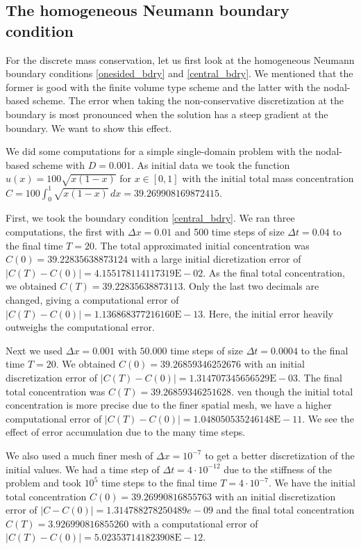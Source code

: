 %
%
\subsection{The homogeneous Neumann boundary condition}
%
%

For the discrete mass conservation, let us first look at the homogeneous Neumann boundary conditions
\eqref{onesided_bdry} and \eqref{central_bdry}. We mentioned that the
former is good with the finite volume type scheme and the latter with the nodal-based scheme. 
The error when taking the non-conservative discretization at
the boundary is most pronounced when the solution has a steep gradient
at the boundary. We want to show this effect.

We did some computations for a simple single-domain problem with the nodal-based scheme with $D=0.001$. 
As initial data we took the function $u(x) = 100\sqrt{x(1-x)}$ for $x\in [0,1]$
with the initial total mass concentration $C=100\int_{0}^{1} \sqrt{x(1-x)}\,dx=39.269908169872415$.

First, we took the boundary condition \eqref{central_bdry}.
We ran three computations, the first with $\Delta x = 0.01$ and 500 time steps
of size $\Delta t = 0.04$ to the final time $T=20$.
The total approximated initial concentration was $C(0)=39.22835638873124$
with a large initial dicretization error of $|C(T)-C(0)|= 4.155178114117319\text{E}-02$. As the final
total concentration, we obtained $C(T) =39.22835638873113$. Only the last two decimals
are changed, giving a computational error of $|C(T)-C(0)|=1.136868377216160\text{E}-13$. Here, the initial error heavily outweighs the computational error.

Next we used $\Delta x = 0.001$ with $50.000$ time steps of size $\Delta t = 0.0004$ to
the final time $T=20$.
We obtained $C(0) = 39.26859346252676$ with an initial discretization error of $|C(T)-C(0)|=1.314707345656529\text{E}-03$. The final total concentration was
$C(T)=39.26859346251628$. 
ven though the initial total concentration is
more precise due to the finer spatial mesh, we have a higher computational error of
$|C(T)-C(0)|=1.048050535246148\text{E}-11$. We see the effect of error accumulation due to the
many time steps. 

We also used a much finer mesh of $\Delta x = 10^{-7}$ to get 
a better discretization of the initial values.
We had a time step of $\Delta t = 4\cdot 10^{-12}$ due to the stiffness of the problem and took $10^5$ time steps to the
final time $T=4\cdot 10^{-7}$. We have the initial total
concentration $C(0)=39.26990816855763$ with an initial discretization error of $|C-C(0)|=1.314788278250489e-09$ and the final
total concentration $C(T)=3.926990816855260$ with a computational error of $|C(T)-C(0)|=5.023537141823908\text{E}-12$.

